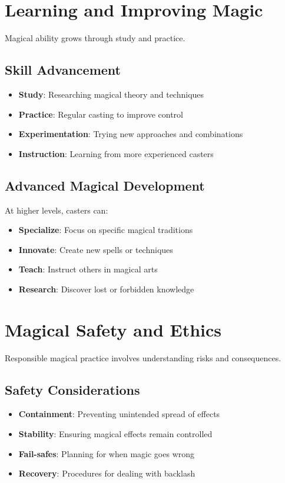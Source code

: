 \begin{multicols}{2}
\section{Learning and Improving Magic} 

Magical ability grows through study and practice.

\subsection*{Skill Advancement}
\begin{itemize}
\item \textbf{Study}: Researching magical theory and techniques
\item \textbf{Practice}: Regular casting to improve control
\item \textbf{Experimentation}: Trying new approaches and combinations
\item \textbf{Instruction}: Learning from more experienced casters
\end{itemize}

\subsection*{Advanced Magical Development}
At higher levels, casters can:
\begin{itemize}
\item \textbf{Specialize}: Focus on specific magical traditions
\item \textbf{Innovate}: Create new spells or techniques
\item \textbf{Teach}: Instruct others in magical arts
\item \textbf{Research}: Discover lost or forbidden knowledge
\end{itemize}

\section{Magical Safety and Ethics}  

Responsible magical practice involves understanding risks and consequences.

\subsection*{Safety Considerations}
\begin{itemize}
\item \textbf{Containment}: Preventing unintended spread of effects
\item \textbf{Stability}: Ensuring magical effects remain controlled
\item \textbf{Fail-safes}: Planning for when magic goes wrong
\item \textbf{Recovery}: Procedures for dealing with backlash
\end{itemize}


\end{multicols}
